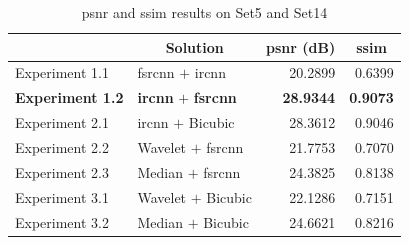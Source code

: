 \begin{table}[]
	\centering
	\begin{tabular}{|l|l|r|r|}
		\hline
		\rowcolor[HTML]{EFEFEF} 
		\multicolumn{1}{|c|}{\cellcolor[HTML]{EFEFEF}\textbf{Experiment}} &
		\multicolumn{1}{c|}{\cellcolor[HTML]{EFEFEF}\textbf{Solution}} & \multicolumn{1}{c|}{\cellcolor[HTML]{EFEFEF}\textbf{\gls{psnr} (dB)}} & \multicolumn{1}{c|}{\cellcolor[HTML]{EFEFEF}\textbf{\gls{ssim}}} \\ \hline
		\rowcolor[HTML]{FFFFFF} 
		\cellcolor[HTML]{EFEFEF} Experiment 1.1 & \gls{fsrcnn} $+$ \gls{ircnn} & 20.2899 & 0.6399 \\
		\rowcolor[HTML]{EFEFEF} 
		\cellcolor[HTML]{EFEFEF} \textbf{Experiment 1.2} & \textbf{\gls{ircnn}} $+$ \textbf{\gls{fsrcnn}} & \textbf{28.9344} & \textbf{0.9073} \\
		\rowcolor[HTML]{FFFFFF} 
		\cellcolor[HTML]{EFEFEF} Experiment 2.1 & \gls{ircnn} $+$ Bicubic & 28.3612 & 0.9046\\
		\rowcolor[HTML]{EFEFEF} 
		\cellcolor[HTML]{EFEFEF} Experiment 2.2 & Wavelet $+$ \gls{fsrcnn} & 21.7753 & 0.7070 \\ 
		\rowcolor[HTML]{FFFFFF} 
		\cellcolor[HTML]{EFEFEF} Experiment 2.3 & Median $+$ \gls{fsrcnn} & 24.3825 & 0.8138 \\
		\rowcolor[HTML]{EFEFEF} 
		\cellcolor[HTML]{EFEFEF} Experiment 3.1 & Wavelet $+$ Bicubic & 22.1286 & 0.7151 \\ 
		\rowcolor[HTML]{FFFFFF} 
		\cellcolor[HTML]{EFEFEF} Experiment 3.2 & Median $+$ Bicubic & 24.6621 & 0.8216 \\
		\hline
	\end{tabular}
	\caption{\gls{psnr} and \gls{ssim} results on Set5 and Set14}
	\label{tab:expsum}
\end{table}
